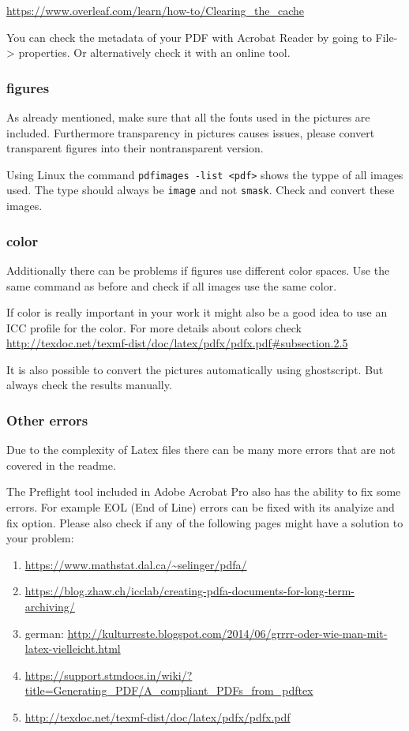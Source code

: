 \url{https://www.overleaf.com/learn/how-to/Clearing_the_cache}

You can check the metadata of your PDF with Acrobat Reader by going to File-> properties. Or alternatively check it with an online tool.

\subsubsection{figures}
As already mentioned, make sure that all the fonts used in the pictures are included. Furthermore transparency in pictures causes issues, please convert transparent figures into their nontransparent version. 

Using Linux the command \verb|pdfimages -list <pdf>| shows the typpe of all images used. The type should always be \verb|image| and not \verb|smask|. Check and convert these images.

\subsubsection{color}
Additionally there can be problems if figures use different color spaces. Use the same command as before and check if all images use the same color. 

If color is really important in your work it might also be a good idea to use an ICC profile for the color. 
For more details about colors check \url{http://texdoc.net/texmf-dist/doc/latex/pdfx/pdfx.pdf#subsection.2.5}

It is also possible to convert the pictures automatically using ghostscript. But always check the results manually. 

\subsubsection{Other errors}
Due to the complexity of Latex files there can be many more errors that are not covered in the readme.

The Preflight tool included in Adobe Acrobat Pro also has the ability to fix some errors. For example EOL (End of Line) errors can be fixed with its analyize and fix option. 
Please also check if any of the following pages might have a solution to your problem:
\begin{enumerate}
    \item \url{https://www.mathstat.dal.ca/~selinger/pdfa/}
    \item \url{https://blog.zhaw.ch/icclab/creating-pdfa-documents-for-long-term-archiving/}
    \item german: \url{http://kulturreste.blogspot.com/2014/06/grrrr-oder-wie-man-mit-latex-vielleicht.html}
    \item \url{https://support.stmdocs.in/wiki/?title=Generating_PDF/A_compliant_PDFs_from_pdftex}
    \item \url{http://texdoc.net/texmf-dist/doc/latex/pdfx/pdfx.pdf}
\end{enumerate}

